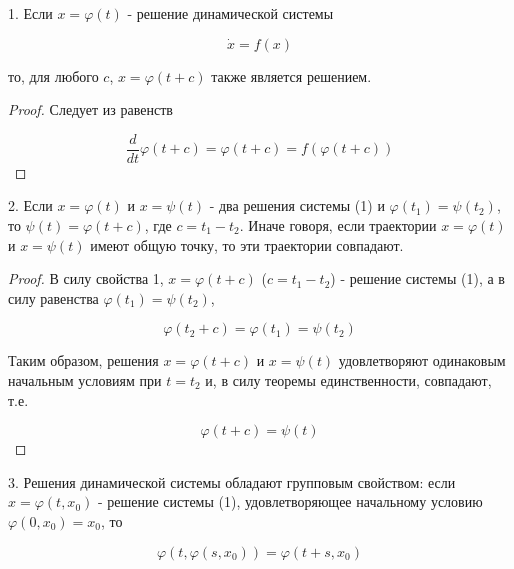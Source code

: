 \documentclass{article}
\theoremstyle{plain} \newtheorem*{theorem*}{Теорема}
\theoremstyle{plain} \newtheorem{theorem}{Теорема}[section]
\theoremstyle{definition} \newtheorem*{corollary*}{Следствие}
\theoremstyle{definition} \newtheorem{corollary}{Следствие}[section]
\begin{document}
\abovedisplayskip=0pt
\belowdisplayskip=9pt
\abovedisplayshortskip=0pt
\belowdisplayshortskip=12pt

1. Если $ x = \varphi(t)$ - решение динамической системы

\begin{equation}
    \dot{x} = f(x)
\end{equation}

то, для любого $c$, $x = \varphi(t + c)$
также является решением.
\begin{proof}
Следует из равенств

\begin{equation*}
    \frac{d}{dt} \varphi(t + c) = \varphi(t + c) =
    f(\varphi(t + c))
\end{equation*}

\end{proof}

2. Если $x = \varphi(t)$ и $x = \psi(t)$ -
два решения системы (1) и $\varphi(t_1) = \psi(t_2)$,
то $\psi(t) = \varphi(t + c)$, где $c = t_1 - t_2$.
Иначе говоря, если траектории $x = \varphi(t)$ и
$x = \psi(t)$ имеют общую точку,
то эти траектории совпадают.

\begin{proof}
В силу свойства 1, $x = \varphi(t + c)$
($c = t_1 - t_2$) - решение системы (1),
а в силу равенства $\varphi(t_1) = \psi(t_2)$,

\begin{equation*}
    \varphi(t_2 + c) = \varphi(t_1) = \psi(t_2)
\end{equation*}

Таким образом, решения $x = \varphi(t + c)$ и $x = \psi(t)$
удовлетворяют одинаковым начальным
условиям при $t = t_2$ и, в силу теоремы единственности,
совпадают, т.е.

\begin{equation*}
    \varphi(t + c) = \psi(t)
\end{equation*}

\end{proof}

3. Решения динамической системы обладают групповым свойством:
если $x = \varphi(t, x_0)$ - решение системы (1),
удовлетворяющее начальному условию $\varphi(0, x_0) = x_0$, то

\begin{equation*}
    \varphi(t, \varphi(s, x_0)) = \varphi(t + s, x_0)
\end{equation*}
\end{document}
